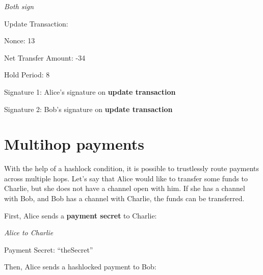 \documentclass[a4paper]{article}
\newcommand{\bgls}[1]{\textbf{\gls{#1}}}
\newenvironment{mydescription}
{\begin{description}
\setlength{\itemsep}{5pt}
  \setlength{\parskip}{0pt}
  \setlength{\labelsep}{5pt}
}{
\end{description}}
\begin{document}
\begin{mdframed}[style=message]{\emph{Both sign}}
\begin{mydescription}
\item[Update Transaction:] \hfill
\begin{mydescription}
  \item[Nonce:] 13
  \item[Net Transfer Amount:] -34
  \item[Hold Period:] 8
\end{mydescription}
\item[Signature 1:] Alice's signature on \bgls{update transaction}
\item[Signature 2:] Bob's signature on \bgls{update transaction}
\end{mydescription}
\end{mdframed}

\section{Multihop payments}

With the help of a hashlock condition, it is possible to trustlessly route payments across multiple hops. Let's say that Alice would like to transfer some funds to Charlie, but she does not have a channel open with him. If she has a channel with Bob, and Bob has a channel with Charlie, the funds can be transferred.

First, Alice sends a \bgls{payment secret} to Charlie:

\begin{mdframed}[style=message]{\emph{Alice to Charlie}}
\begin{mydescription}
\item[Payment Secret:] ``theSecret''
\end{mydescription}
\end{mdframed}

Then, Alice sends a hashlocked payment to Bob:
\end{document}
